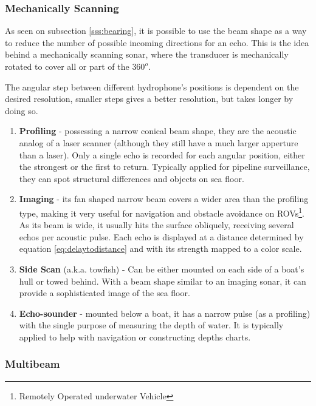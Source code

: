\subsubsection{Mechanically Scanning}

As seen on subsection \ref{sss:bearing}, it is possible to use the beam shape as
a way to reduce the number of possible incoming directions for an echo. This is
the idea behind a mechanically scanning sonar, where the transducer is
mechanically rotated to cover all or part of the $360^o$.

The angular step between different hydrophone's positions is dependent on the
desired resolution, smaller steps gives a better resolution, but takes longer
by doing so.

\begin{enumerate}
  \item \textbf{Profiling} - possessing a narrow conical beam shape, they are the
  acoustic analog of a laser scanner (although they still have a much larger
  apperture than a laser). Only a single echo is recorded for each angular
  position, either the strongest or the first to return. Typically applied for
  pipeline surveillance, they can spot structural differences and objects on
  sea floor.
  \item \textbf{Imaging} - its fan shaped narrow beam covers a wider area than
  the profiling type, making it very useful for navigation and obstacle
  avoidance on ROVs\footnote{Remotely Operated underwater Vehicle}. As its beam
  is wide, it usually hits the surface obliquely, receiving several echos per
  acoustic pulse. Each echo is displayed at a distance determined by equation
  \ref{eq:delaytodistance} and with its strength mapped to a color scale.
  \item \textbf{Side Scan} (a.k.a. towfish) - Can be either mounted on each side
  of a boat's hull or towed behind. With a beam shape similar to an imaging
  sonar, it can provide a sophisticated image of the sea floor.
  \item \textbf{Echo-sounder} - mounted below a boat, it has a narrow pulse
  (as a profiling) with the single purpose of measuring the depth of water. It
  is typically applied to help with navigation or constructing depths charts.
\end{enumerate}


\subsubsection{Multibeam}


